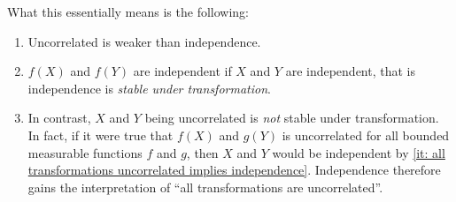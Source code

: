 \begin{exercise}
    \begin{remark}[Interpretation]
        What this essentially means is the following:
        \begin{enumerate}
            \item Uncorrelated is weaker than independence.
            \item \(f(X)\) and \(f(Y)\) are independent if \(X\) and \(Y\)
            are independent, that is independence is \emph{stable under transformation}.

            \item In contrast, \(X\) and \(Y\) being uncorrelated is \emph{not} stable under transformation.
            In fact, if it were true that \(f(X)\) and \(g(Y)\) is uncorrelated
            for all bounded measurable functions \(f\) and \(g\), then \(X\) and
            \(Y\) would be independent by \ref{it: all transformations
            uncorrelated implies independence}. Independence therefore gains the
            interpretation of ``all transformations are uncorrelated''.
        \end{enumerate}

    \end{remark}
\end{exercise}

